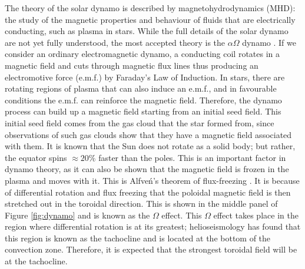 The theory of the solar dynamo is described by magnetohydrodynamics (MHD): the study of the magnetic properties and behaviour of fluids that are electrically conducting, such as plasma in stars. While the full details of the solar dynamo are not yet fully understood, the most accepted theory is the $\alpha\Omega$ dynamo \citep{Choudhuri_2007}. If we consider an ordinary electromagnetic dynamo, a conducting coil rotates in a magnetic field and cuts through magnetic flux lines thus producing an electromotive force (e.m.f.) by Faraday's Law of Induction. In stars, there are rotating regions of plasma that can also induce an e.m.f., and in favourable conditions the e.m.f. can reinforce the magnetic field. Therefore, the dynamo process can build up a magnetic field starting from an initial seed field. This initial seed field comes from the gas cloud that the star formed from, since observations of such gas clouds show that they have a magnetic field associated with them. It is known that the Sun does not rotate as a solid body; but rather, the equator spins $\approx 20 \%$ faster than the poles. This is an important factor in dynamo theory, as it can also be shown that the magnetic field is frozen in the plasma and moves with it. This is Alfve\'n's theorem of flux-freezing \citep{Alfven_1942}. It is because of differential rotation and flux freezing that the poloidal magnetic field is then stretched out in the toroidal direction. This is shown in the middle panel of Figure \ref{fig:dynamo} and is known as the $\Omega$ effect. This $\Omega$ effect takes place in the region where differential rotation is at its greatest; helioseismology has found that this region is known as the tachocline and is located at the bottom of the convection zone. Therefore, it is expected that the strongest toroidal field will be at the tachocline.

